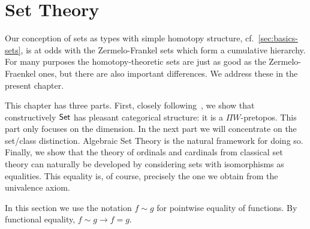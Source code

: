 \chapter{Set Theory}
\label{cha:set-math}

Our conception of sets as types with simple homotopy structure, cf.\
\autoref{sec:basics-sets}, is at odds with the Zermelo-Frankel sets which form a
cumulative hierarchy. For many purposes the homotopy-theoretic sets are just as good as
the Zermelo-Fraenkel ones, but there are also important differences. We address these in
the present chapter. 

This chapter has three parts. First, closely following~\cite{RijkeSpitters}, we show that constructively $\mathsf{Set}$ has pleasant categorical
structure: it is a $\Pi W$-pretopos. This part only focuses on the dimension. In the next part we will concentrate on the set/class
distinction. Algebraic Set
Theory is the natural framework for doing so. Finally, we show that the theory of ordinals and cardinals from classical set theory can
naturally be developed by considering sets with isomorphisms as equalities. This equality is, of course, precisely the one we obtain from
the univalence axiom.

In this section we use the notation $f\sim g$ for pointwise equality of functions. By functional equality, $f\sim g\to f=g$.

